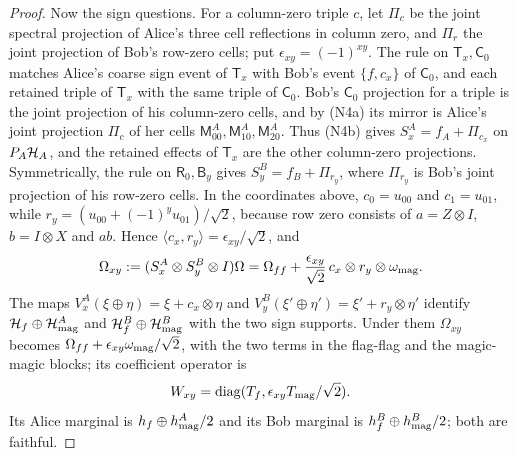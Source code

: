 \begin{proof}
Now the sign questions. For a column-zero triple $c$, let $\Pi_c$ be the joint spectral projection of Alice's three cell reflections in column zero, and $\Pi_r$ the joint projection of Bob's row-zero cells; put $\epsilon_{xy}=(-1)^{xy}$. The rule on $\mathsf T_x,\mathsf C_0$ matches Alice's coarse sign event of $\mathsf T_x$ with Bob's event $\{f,c_x\}$ of $\mathsf C_0$, and each retained triple of $\mathsf T_x$ with the same triple of $\mathsf C_0$. Bob's $\mathsf C_0$ projection for a triple is the joint projection of his column-zero cells, and by (N4a) its mirror is Alice's joint projection $\Pi_c$ of her cells $\mathsf M^A_{00},\mathsf M^A_{10},\mathsf M^A_{20}$. Thus (N4b) gives $S^A_x=f_A+\Pi_{c_x}$ on $P_A\mathcal H_A$, and the retained effects of $\mathsf T_x$ are the other column-zero projections. Symmetrically, the rule on $\mathsf R_0,\mathsf B_y$ gives $S^B_y=f_B+\Pi_{r_y}$, where $\Pi_{r_y}$ is Bob's joint projection of his row-zero cells. In the coordinates above, $c_0=u_{00}$ and $c_1=u_{01}$, while $r_y=(u_{00}+(-1)^yu_{01})/\sqrt2$, because row zero consists of $a=Z\otimes I$, $b=I\otimes X$ and $ab$. Hence $\langle c_x,r_y\rangle=\epsilon_{xy}/\sqrt2$, and
\[
 \Omega_{xy}:=(S^A_x\otimes S^B_y\otimes I)\Omega
 =\Omega_{ff}+\frac{\epsilon_{xy}}{\sqrt2}\,c_x\otimes r_y\otimes\omega_{\rm mag}.
\]
The maps $V^A_x(\xi\oplus\eta)=\xi+c_x\otimes\eta$ and $V^B_y(\xi'\oplus\eta')=\xi'+r_y\otimes\eta'$ identify $\mathcal H_f\oplus\mathcal H^A_{\rm mag}$ and $\mathcal H^B_f\oplus\mathcal H^B_{\rm mag}$ with the two sign supports. Under them $\Omega_{xy}$ becomes $\Omega_{ff}+\epsilon_{xy}\omega_{\rm mag}/\sqrt2$, with the two terms in the flag-flag and the magic-magic blocks; its coefficient operator is
\[
 W_{xy}=\operatorname{diag}(T_f,\epsilon_{xy}T_{\rm mag}/\sqrt2).
\]
Its Alice marginal is $h_f\oplus h^A_{\rm mag}/2$ and its Bob marginal is $h^B_f\oplus h^B_{\rm mag}/2$; both are faithful.


\end{proof}
